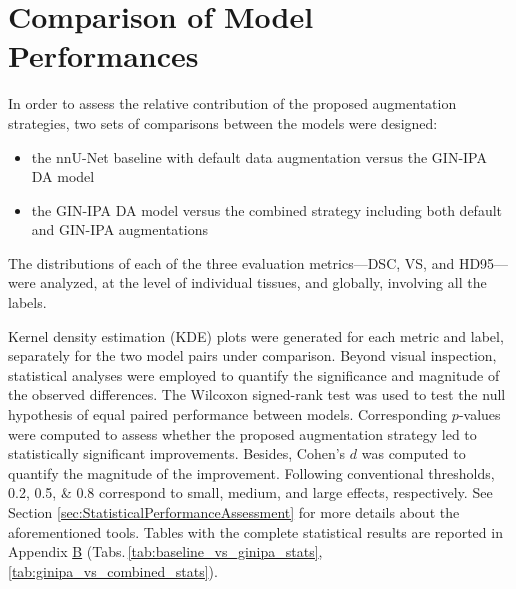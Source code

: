 \section{Comparison of Model Performances} \label{sec:ComparisonOfModelPerformances}
In order to assess the relative contribution of the proposed augmentation strategies, two sets of comparisons between the models were designed:
\begin{itemize}
  \item the nnU-Net baseline with default data augmentation versus the GIN-IPA DA model
  \item the GIN-IPA DA model versus the combined strategy including both default and GIN-IPA augmentations
\end{itemize}
The distributions of each of the three evaluation metrics---DSC, VS, and HD95---were analyzed, at the level of individual tissues, and globally, involving all the labels.

Kernel density estimation (KDE) plots were generated for each metric and label, separately for the two model pairs under comparison. Beyond visual inspection, statistical analyses were employed to quantify the significance and magnitude of the observed differences. The Wilcoxon signed-rank test was used to test the null hypothesis of equal paired performance between models. Corresponding $p$-values were computed to assess whether the proposed augmentation strategy led to statistically significant improvements. Besides, Cohen's $d$ was computed to quantify the magnitude of the improvement. Following conventional thresholds, \numlist{0.2; 0.5; 0.8} correspond to small, medium, and large effects, respectively. See Section \ref{sec:StatisticalPerformanceAssessment} for more details about the aforementioned tools. Tables with the complete statistical results are reported in Appendix \hyperref[app:SupplementaryTables]{B} (Tabs.\,\ref{tab:baseline_vs_ginipa_stats}, \ref{tab:ginipa_vs_combined_stats}).

